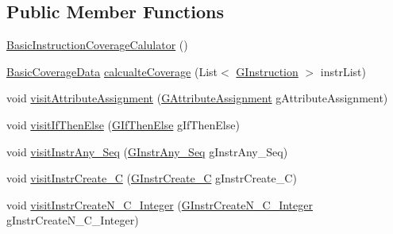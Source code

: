 \subsection*{Public Member Functions}
\begin{DoxyCompactItemize}
\item 
\hyperlink{classorg_1_1tzi_1_1use_1_1gen_1_1assl_1_1statics_1_1_basic_instruction_coverage_calulator_a8dba34fae6d497ecd8fbb8a47fc9f1a6}{Basic\-Instruction\-Coverage\-Calulator} ()
\item 
\hyperlink{classorg_1_1tzi_1_1use_1_1analysis_1_1coverage_1_1_basic_coverage_data}{Basic\-Coverage\-Data} \hyperlink{classorg_1_1tzi_1_1use_1_1gen_1_1assl_1_1statics_1_1_basic_instruction_coverage_calulator_a4ee83c57ab2082946fa656b3726a4f33}{calcualte\-Coverage} (List$<$ \hyperlink{interfaceorg_1_1tzi_1_1use_1_1gen_1_1assl_1_1statics_1_1_g_instruction}{G\-Instruction} $>$ instr\-List)
\item 
void \hyperlink{classorg_1_1tzi_1_1use_1_1gen_1_1assl_1_1statics_1_1_basic_instruction_coverage_calulator_ad3fcbacf6989bd2a11f61648128f067c}{visit\-Attribute\-Assignment} (\hyperlink{classorg_1_1tzi_1_1use_1_1gen_1_1assl_1_1statics_1_1_g_attribute_assignment}{G\-Attribute\-Assignment} g\-Attribute\-Assignment)
\item 
void \hyperlink{classorg_1_1tzi_1_1use_1_1gen_1_1assl_1_1statics_1_1_basic_instruction_coverage_calulator_ae4586b11c228de17131b9d0441b13681}{visit\-If\-Then\-Else} (\hyperlink{classorg_1_1tzi_1_1use_1_1gen_1_1assl_1_1statics_1_1_g_if_then_else}{G\-If\-Then\-Else} g\-If\-Then\-Else)
\item 
void \hyperlink{classorg_1_1tzi_1_1use_1_1gen_1_1assl_1_1statics_1_1_basic_instruction_coverage_calulator_a24709cec2dfcad6c522b60451af43f38}{visit\-Instr\-Any\-\_\-\-Seq} (\hyperlink{classorg_1_1tzi_1_1use_1_1gen_1_1assl_1_1statics_1_1_g_instr_any___seq}{G\-Instr\-Any\-\_\-\-Seq} g\-Instr\-Any\-\_\-\-Seq)
\item 
void \hyperlink{classorg_1_1tzi_1_1use_1_1gen_1_1assl_1_1statics_1_1_basic_instruction_coverage_calulator_aa2a42ccb06d1ce0aa773afed574ef073}{visit\-Instr\-Create\-\_\-\-C} (\hyperlink{classorg_1_1tzi_1_1use_1_1gen_1_1assl_1_1statics_1_1_g_instr_create___c}{G\-Instr\-Create\-\_\-\-C} g\-Instr\-Create\-\_\-\-C)
\item 
void \hyperlink{classorg_1_1tzi_1_1use_1_1gen_1_1assl_1_1statics_1_1_basic_instruction_coverage_calulator_a80e102f199635622ead4ab4a3e031c9a}{visit\-Instr\-Create\-N\-\_\-\-C\-\_\-\-Integer} (\hyperlink{classorg_1_1tzi_1_1use_1_1gen_1_1assl_1_1statics_1_1_g_instr_create_n___c___integer}{G\-Instr\-Create\-N\-\_\-\-C\-\_\-\-Integer} g\-Instr\-Create\-N\-\_\-\-C\-\_\-\-Integer)

\end{DoxyCompactItemize}
